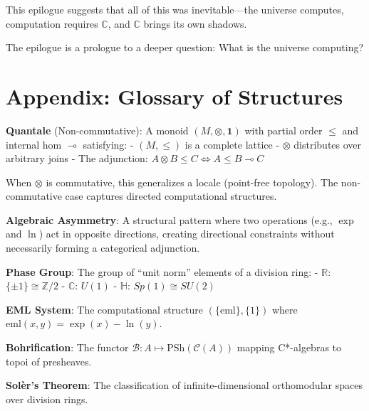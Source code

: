 \documentclass[11pt]{article}
\begin{document}
This epilogue suggests that all of this was inevitable---the universe computes, computation requires $\mathbb{C}$, and $\mathbb{C}$ brings its own shadows.

The epilogue is a prologue to a deeper question: What is the universe computing?

\section{Appendix: Glossary of Structures}
\label{appendix-glossary-of-structures}

\textbf{Quantale} (Non-commutative): A monoid \((M, \otimes, \mathbf{1})\) with partial order \(\leq\) and internal hom \(\multimap\) satisfying: - \((M, \leq)\) is a complete lattice - \(\otimes\) distributes over arbitrary joins - The adjunction: \(A \otimes B \leq C \iff A \leq B \multimap C\)

When \(\otimes\) is commutative, this generalizes a locale (point-free topology). The non-commutative case captures directed computational structures.

\textbf{Algebraic Asymmetry}: A structural pattern where two operations (e.g., \(\exp\) and \(\ln\)) act in opposite directions, creating directional constraints without necessarily forming a categorical adjunction.

\textbf{Phase Group}: The group of ``unit norm'' elements of a division ring: - $\mathbb{R}$: \(\{\pm 1\} \cong \mathbb{Z}/2\) - $\mathbb{C}$: \(U(1)\) - $\mathbb{H}$: \(Sp(1) \cong SU(2)\)

\textbf{EML System}: The computational structure \((\{\mathrm{eml}\}, \{1\})\) where \(\mathrm{eml}(x,y) = \exp(x) - \ln(y)\).

\textbf{Bohrification}: The functor \(\mathcal{B}: A \mapsto \mathrm{PSh}(\mathcal{C}(A))\) mapping C*-algebras to topoi of presheaves.

\textbf{Solèr's Theorem}: The classification of infinite-dimensional orthomodular spaces over division rings.
\end{document}
